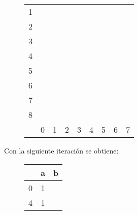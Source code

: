 \documentclass[11pt,a4paper]{article}
\begin{document}
		\begin{figure}[H]
			\centering
			\begin{tabular}{*{9}{c|}}
																							\cline{2-2}
				1 & \color{blue}{X}															\\ \cline{2-3}
				2 & \color{blue}{X} &														\\ \cline{2-4}
				3 & \color{blue}{X} & &											\\ \cline{2-5}
				4 & & \color{blue}{X} & \color{blue}{X} & \color{blue}{X}	\\ \cline{2-6}
				5 & \color{red}{X} & \color{blue}{X} & \color{blue}{X} & \color{blue}{X} & \color{red}{X} \\ \cline{2-7}
				6 & \color{red}{X} & \color{blue}{X} & \color{blue}{X} & \color{blue}{X} &
				  & \color{red}{X} \\ \cline{2-8}
				7 & \color{red}{X} & \color{blue}{X} & \color{blue}{X} & \color{blue}{X} & \color{red}{X} & 
				  & \color{red}{X} \\ \cline{2-9}
				8 & \color{blue}{X} & \color{red}{X} & \color{red}{X} & \color{red}{X} & \color{blue}{X} & \color{blue}{X} &
					\color{blue}{X} & \color{blue}{X} \\ \cline{2-9}
				\multicolumn{0}{c}{} & \multicolumn{1}{c}{0} & \multicolumn{1}{c}{1} & \multicolumn{1}{c}{2}
				& \multicolumn{1}{c}{3} & \multicolumn{1}{c}{4} & \multicolumn{1}{c}{5} & \multicolumn{1}{c}{6}
				& \multicolumn{1}{c}{7}
			\end{tabular}
		\end{figure}
		
		Con la siguiente iteración se obtiene:
		
		\begin{figure}[H]
			\centering
			\begin{tabular}{c|cc}
				& a & b		\\ \hline
				0 & 1 & \color{red}{3}	\\
				4 & 1 & \color{red}{5}	\\ \hline
			\end{tabular}
		\end{figure}
		
\end{document}
